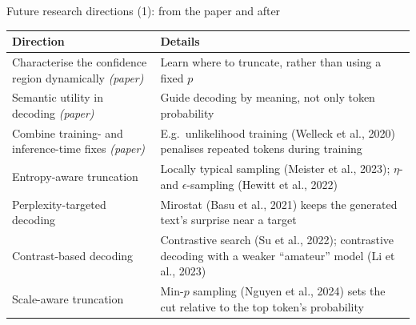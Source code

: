 \documentclass[aspectratio=169,11pt]{beamer}
\begin{document}
\begin{frame}{Future research directions (1): from the paper and after}
  \footnotesize
  \begin{tabularx}{\textwidth}{@{}lX@{}}
    \toprule
    Direction & Details\\
    \midrule
    Characterise the confidence region dynamically \emph{(paper)} & Learn where to truncate, rather than using a fixed $p$\\
    Semantic utility in decoding \emph{(paper)} & Guide decoding by meaning, not only token probability\\
    Combine training- and inference-time fixes \emph{(paper)} & E.g.\ unlikelihood training (Welleck et al., 2020) penalises repeated tokens during training\\
    Entropy-aware truncation & Locally typical sampling (Meister et al., 2023); $\eta$- and $\epsilon$-sampling (Hewitt et al., 2022)\\
    Perplexity-targeted decoding & Mirostat (Basu et al., 2021) keeps the generated text's surprise near a target\\
    Contrast-based decoding & Contrastive search (Su et al., 2022); contrastive decoding with a weaker ``amateur'' model (Li et al., 2023)\\
    Scale-aware truncation & Min-$p$ sampling (Nguyen et al., 2024) sets the cut relative to the top token's probability\\
    \bottomrule
  \end{tabularx}
\end{frame}
\end{document}
